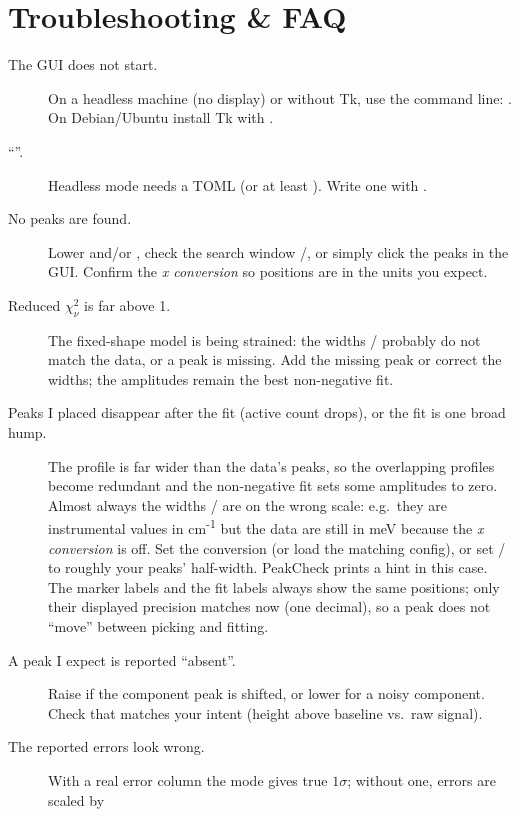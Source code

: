 \documentclass[11pt,a4paper]{article}
\begin{document}
\section{Troubleshooting \& FAQ}
\begin{description}
\item[The GUI does not start.] On a headless machine (no display) or without Tk,
use the command line: . On Debian/Ubuntu
install Tk with .
\item[\textnormal{``''.}] Headless mode needs a
TOML (or at least ). Write one with
.
\item[No peaks are found.] Lower  and/or ,
check the search window /, or simply click the peaks in the
GUI. Confirm the \emph{x conversion} so positions are in the units you expect.
\item[Reduced $\chi^2_\nu$ is far above 1.] The fixed-shape model is being
strained: the widths / probably do not match the data, or a peak
is missing. Add the missing peak or correct the widths; the amplitudes remain the
best non-negative fit.
\item[Peaks I placed disappear after the fit (active count drops), or the fit is
one broad hump.] The profile is far wider than the data's peaks, so the
overlapping profiles become redundant and the non-negative fit sets some
amplitudes to zero. Almost always the widths / are on the wrong
scale: e.g.\ they are instrumental values in cm\textsuperscript{-1} but the data
are still in meV because the \emph{x conversion} is off. Set the conversion (or
load the matching config), or set / to roughly your peaks'
half-width. PeakCheck prints a hint in this case. The marker labels and the fit
labels always show the same positions; only their displayed precision matches now
(one decimal), so a peak does not ``move'' between picking and fitting.
\item[A peak I expect is reported ``absent''.] Raise  if the
component peak is shifted, or lower  for a noisy component. Check
that  matches your intent (height above baseline
vs.\ raw signal).
\item[The reported errors look wrong.] With a real error column the
 mode gives true $1\sigma$; without one, errors are scaled by

\end{description}
\end{document}
